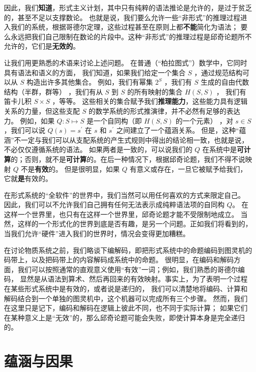 \documentclass[a4paper,12pt]{article}
\begin{document}
因此，我们\textbf{知道}，形式主义计划，其中只有纯粹的语法推论是允许的，是过于贫乏的，甚至不足以支撑数论。
也就是说，我们要么允许一些“非形式”的推理过程进入我们的系统，根据哥德尔定理，这些过程甚至在原则上都\textbf{不能}简化为语法；
要么永远把我们自己限制在数论的片段中。这种“非形式”的推理过程是邱奇论题所不允许的，它们是\textbf{无效的}。

让我们用更熟悉的术语来讨论上述问题。 在普通（“柏拉图式”）数学中，它同时具有语法和语义的方面，
我们知道，如果我们给定一个集合 $S$ ，通过规范结构可以从 $S$ 构造出许多其他集合。
例如，我们有幂集 $2^S$ ，我们有 $S$ 生成的自由代数结构（半群，群等） ，我们有从 $S$ 到 $S$ 的所有映射的集合 $H(S, S)$ ，
我们有笛卡儿积 $S \times S$ ，等等。
这些相关的集合赋予我们\textbf{推理能力}，这些能力具有\gls{逻辑关系}的力量，但这些支配 $S$ 的数学系统的形式推演律，并不必然有足够的表达力。
例如，如果 $Q: S \mapsto S$ 是一个自同构（即 $H(S, S)$ 的一个元素） ，对 $s \in S $，我们可以说 $Q(s) = s^{\prime}$ 在 $s$ 和 $s^{\prime}$ 之间建立了一个蕴涵关系。
但是，这种“蕴涵”不一定与我们可以从支配系统的产生式规则中得出的结论相一致，也就是说，不必仅仅遵循系统的语法。
如果两者是一致的，可以说我们的 $Q$ 在系统中是\textbf{可计算}的；否则，就不是\textbf{可计算}的。在后一种情况下，根据邱奇论题，我们不得不说映射 $Q$ 不是\textbf{有效}的。
但是很明显，如果 $Q$ 有意义或存在，一旦它被赋予给我们，它就\textbf{是}有效的。

在形式系统的“全软件”的世界中，我们当然可以用任何喜欢的方式来限定自己。
因此，我们可以不允许我们自己拥有任何无法表示成纯粹语法项的自同构 $Q$。
在这样一个世界里，也只有在这样一个世界里，邱奇论题才能不受限制地成立。
当然，这样的一个形式化的世界到底是否有趣，是另一个问题。正如我们将看到的，当我们允许“硬件”进入我们的世界时，情况会变得更加糟糕。

在讨论物质系统之前，我们略谈下编解码，即把形式系统中的命题编码到图灵机的码带上，以及把码带上的内容解码成系统中的命题。
很明显，在编码和解码方面，我们可以按照通常的直观意义使用“有效”一词；例如，我们熟悉的\gls{哥德尔编码}，
显然是从语法到算术、然后再回来的有效映射。事实上，为了表明一个过程在某些形式系统中是有效的，或者说是递归的，
我们可以清楚地将编码、计算和解码结合到一个单独的图灵机中，这个机器可以完成所有三个步骤。
然而，我们在这里只是记下，编码和解码在逻辑上彼此不同，也不同于实际计算；
如果它们在某种意义上是“无效”的，那么邱奇论题可能会失败，即使计算本身是完全递归的。

\section{蕴涵与因果}
\end{document}
